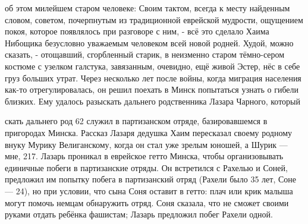 об этом милейшем старом человеке: Своим тактом, всегда к месту найденным словом, советом, почерпнутым из традиционной еврейской мудрости, ощущением покоя, которое появлялось при разговоре с ним, - всё это сделало Хаима Нибощика безусловно уважаемым человеком всей новой родней. Худой, можно сказать, - отощавший, сгорбленный старик, в неизменно старом тёмно-сером костюме с узелком галстука, завязанным, очевидно, ещё живой Эстер, нёс в себе груз больших утрат. Через несколько лет после войны, когда миграция населения как-то отрегулировалась, он решил поехать в Минск попытаться узнать о гибели близких. Ему удалось разыскать дальнего родственника Лазара Чарного, который

скать дальнего род 62 служил в партизанском отряде, базировавшемся в пригородах Минска. Рассказ Лазаря дедушка Хаим пересказал своему родному внуку Мурику Велиганскому, когда он стал уже зрелым юношей, а Шурик — мне, 217. Лазарь проникал в еврейское гетто Минска, чтобы организовывать единичные побеги в партизанские отряды. Он встретился с Рахелью и Соней, предложил им попытку побега в партизанский отряд (Рахели было 35 лет, Соне — 24), но при условии, что сына Соня оставит в гетто: плач или крик малыша могут помочь немцам обнаружить отряд. Соня сказала, что не сможет своими руками отдать ребёнка фашистам; Лазарь предложил побег Рахели одной.

